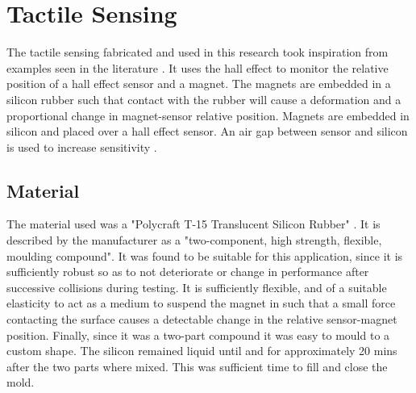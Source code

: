 \chapter{Tactile Sensing} \label{Chapter:TactileSensing}
The tactile sensing fabricated and used in this research took inspiration from examples seen in the literature \cite{First3DHall,James}. It uses the hall effect to monitor the relative position of a hall effect sensor and a magnet. The magnets are embedded in a silicon rubber such that contact with the rubber will cause a deformation and a proportional change in magnet-sensor relative position. Magnets are embedded in silicon and placed over a hall effect sensor. An air gap between sensor and silicon is used to increase sensitivity \cite{HSSoft}.

\section{Material}
The material used was a "Polycraft T-15 Translucent Silicon Rubber" \cite{Silicon}. It is described by the manufacturer as a "two-component, high strength, flexible, moulding compound". It was found to be suitable for this application, since it is sufficiently robust so as to not deteriorate or change in performance after successive collisions during testing. It is sufficiently flexible, and of a suitable elasticity to act as a medium to suspend the magnet in such that a small force contacting the surface causes a detectable change in the relative sensor-magnet position. Finally, since it was a two-part compound it was easy to mould to a custom shape. The silicon remained liquid until and for approximately 20 mins after the two parts where mixed. This was sufficient time to fill and close the mold.

